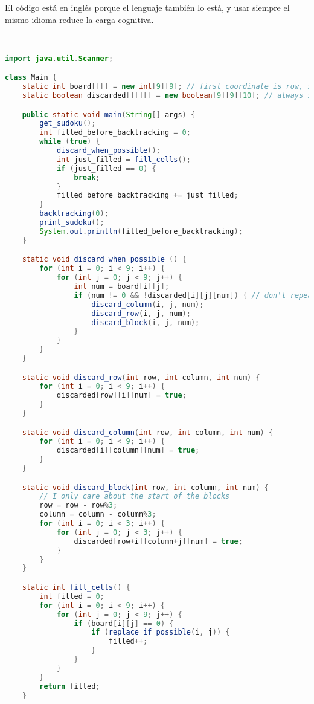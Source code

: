 \documentclass[
  spanish,
  a4paper,
,tablecaptionabove
]{scrartcl}
\begin{document}
El código está en inglés porque el lenguaje también lo está, y usar
siempre el mismo idioma reduce la carga cognitiva.

\_ \_

\begin{lstlisting}[language=Java, basicstyle=\tiny]
import java.util.Scanner;

class Main {
    static int board[][] = new int[9][9]; // first coordinate is row, second is column
    static boolean discarded[][][] = new boolean[9][9][10]; // always skip the first one

    public static void main(String[] args) {
        get_sudoku();
        int filled_before_backtracking = 0;
        while (true) {
            discard_when_possible();
            int just_filled = fill_cells();
            if (just_filled == 0) {
                break;
            }
            filled_before_backtracking += just_filled;
        }
        backtracking(0);
        print_sudoku();
        System.out.println(filled_before_backtracking);
    }

    static void discard_when_possible () {
        for (int i = 0; i < 9; i++) {
            for (int j = 0; j < 9; j++) {
                int num = board[i][j];
                if (num != 0 && !discarded[i][j][num]) { // don't repeat work
                    discard_column(i, j, num);
                    discard_row(i, j, num);
                    discard_block(i, j, num);
                }
            }
        }
    }

    static void discard_row(int row, int column, int num) {
        for (int i = 0; i < 9; i++) {
            discarded[row][i][num] = true;
        }
    }

    static void discard_column(int row, int column, int num) {
        for (int i = 0; i < 9; i++) {
            discarded[i][column][num] = true;
        }
    }

    static void discard_block(int row, int column, int num) {
        // I only care about the start of the blocks
        row = row - row%3;
        column = column - column%3;
        for (int i = 0; i < 3; i++) {
            for (int j = 0; j < 3; j++) {
                discarded[row+i][column+j][num] = true;
            }
        }
    }

    static int fill_cells() {
        int filled = 0;
        for (int i = 0; i < 9; i++) {
            for (int j = 0; j < 9; j++) {
                if (board[i][j] == 0) {
                    if (replace_if_possible(i, j)) {
                        filled++;
                    }
                }
            }
        }
        return filled;
    }


\end{lstlisting}
\end{document}
